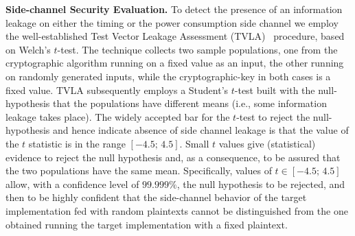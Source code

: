 \noindent\textbf{Side-channel Security Evaluation.} 
To detect the presence of an information leakage on either the timing or 
the power consumption side channel we employ the well-established Test Vector 
Leakage Assessment (TVLA)~\cite{DBLP:journals/jce/SchneiderM16} procedure,
based on Welch's $t$-test. 
The technique collects two sample populations, one from the cryptographic 
algorithm running on a fixed value as an input, the other running on randomly
generated inputs, while the cryptographic-key in both cases is a fixed value.
TVLA subsequently employs a Student's $t$-test built with the null-hypothesis
that the populations have different means (i.e., some information leakage takes
place). The widely accepted bar for the $t$-test to reject the null-hypothesis
and hence indicate absence of side channel leakage is that the value of the $t$
statistic is in the range $[-4.5;\, 4.5]$.
Small $t$ values give (statistical) evidence to reject the null hypothesis and, 
as a consequence, to be assured that the two populations have the same mean. 
Specifically, values of $t \in [-4.5;\,4.5]$ allow, with a confidence level of 
$99.999\%$, the null hypothesis to be rejected, and then to be highly confident 
that the side-channel behavior of the target implementation fed with random plaintexts 
cannot be distinguished from the one obtained running the target implementation with a 
fixed plaintext. 
